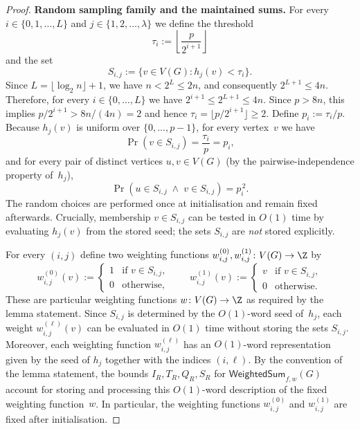 \begin{proof}
\smallskip
\noindent\textbf{Random sampling family and the maintained sums.}
For every $i\in\{0,1,\dots,L\}$ and $j\in\{1,2,\dots,\lambda\}$ we define
the threshold
\[
\tau_i := \left\lfloor \frac{p}{2^{i+1}} \right\rfloor
\]
and the set
\[
S_{i,j} := \bigl\{v\in V(G) : h_j(v) < \tau_i\bigr\}.
\]
Since $L=\lfloor\log_2 n\rfloor+1$, we have $n<2^{L}\le 2n$,
and consequently $2^{L+1}\le 4n$.
Therefore, for every $i\in\{0,\dots,L\}$ we have
$2^{i+1}\le 2^{L+1}\le 4n$.
Since $p>8n$, this implies $p/2^{i+1} > 8n/(4n)=2$ and hence
$\tau_i=\lfloor p/2^{i+1}\rfloor \ge 2$.
Define $p_i := \tau_i/p$.
Because $h_j(v)$ is uniform over $\{0,\dots,p-1\}$,
for every vertex~$v$ we have
\[
\Pr(v\in S_{i,j})
= \frac{\tau_i}{p}
= p_i,
\]
and for every pair of distinct vertices $u,v\in V(G)$
(by the pairwise-independence property of~$h_j$),
\begin{equation}\label{eq:pairwise}
\Pr(u\in S_{i,j} \;\wedge\; v\in S_{i,j})
= p_i^{\,2}.
\end{equation}
The random choices are performed once at initialisation and remain fixed
afterwards. Crucially, membership $v\in S_{i,j}$ can be tested in $O(1)$
time by evaluating $h_j(v)$ from the stored seed; the sets $S_{i,j}$ are
\emph{not} stored explicitly.

For every $(i,j)$ define two weighting functions
$w^{(0)}_{i,j},w^{(1)}_{i,j}\colon V(G)\to\Z$ by
\[
w^{(0)}_{i,j}(v) :=
\begin{cases}
1 & \text{if } v\in S_{i,j},\\
0 & \text{otherwise,}
\end{cases}
\qquad
w^{(1)}_{i,j}(v) :=
\begin{cases}
v & \text{if } v\in S_{i,j},\\
0 & \text{otherwise.}
\end{cases}
\]
These are particular weighting functions $w\colon V(G)\to\Z$ as required by the
lemma statement.
Since $S_{i,j}$ is determined by the $O(1)$-word seed of~$h_j$, each weight
$w^{(\ell)}_{i,j}(v)$ can be evaluated in $O(1)$ time without storing
the sets $S_{i,j}$.
Moreover, each weighting function $w^{(\ell)}_{i,j}$ has an $O(1)$-word
representation given by the seed of $h_j$ together with the indices
$(i,\ell)$.
By the convention of the lemma statement, the bounds $I_R,T_R,Q_R,S_R$ for
$\mathsf{WeightedSum}_{f,w}(G)$ account for storing and processing this
$O(1)$-word description of the fixed weighting function~$w$.
In particular, the weighting functions $w^{(0)}_{i,j}$ and $w^{(1)}_{i,j}$ are
fixed after initialisation.


\end{proof}
